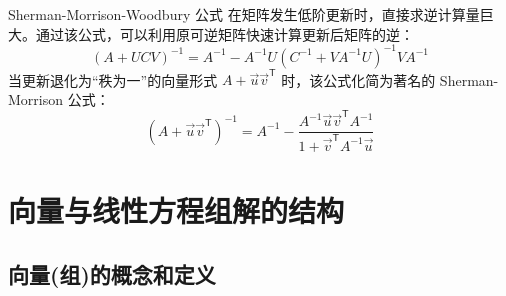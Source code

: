 \documentclass[a4paper,12pt]{ctexart}
\begin{document}
\begin{mythm}{Sherman-Morrison-Woodbury 公式}{}
    在矩阵发生低阶更新时，直接求逆计算量巨大。通过该公式，可以利用原可逆矩阵快速计算更新后矩阵的逆：
    \[
    (A + UCV)^{-1} = A^{-1} - A^{-1}U (C^{-1} + V A^{-1} U)^{-1} V A^{-1}
    \]
    当更新退化为“秩为一”的向量形式 $A + \vec{u}\vec{v}^{\mathsf{T}}$ 时，该公式化简为著名的 Sherman-Morrison 公式：
    \[
    (A+\vec{u}\vec{v}^{\mathsf{T}})^{-1} = A^{-1} - \frac{A^{-1}\vec{u}\vec{v}^{\mathsf{T}}A^{-1}}{1+\vec{v}^{\mathsf{T}}A^{-1}\vec{u}}
    \]
\end{mythm}

\newpage

\section{向量与线性方程组解的结构}

\subsection{向量(组)的概念和定义}
\end{document}
